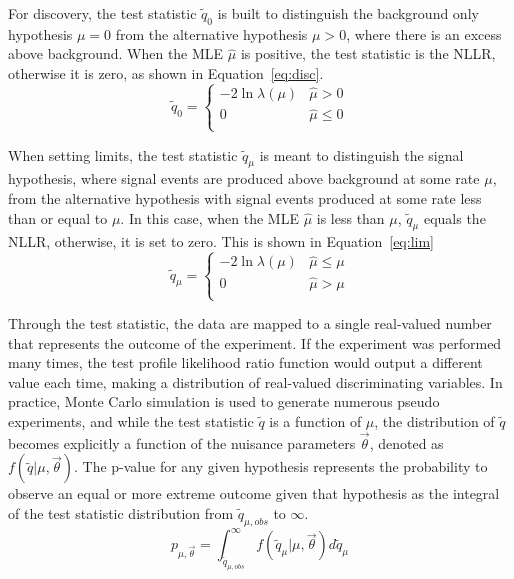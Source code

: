 For discovery, the test statistic $\tilde{q}_0$ is built to distinguish the background only hypothesis $\mu=0$ from the alternative hypothesis $\mu>0$, where there is an excess above background.  When the MLE $\hat{\mu}$ is positive, the test statistic is the NLLR, otherwise it is zero, as shown in Equation~\ref{eq:disc}.
\begin{equation}
\tilde{q}_0=
 \begin{cases} 
      -2\ln\lambda(\mu) & \hat{\mu}> 0 \\
      0 & \hat{\mu}\leq 0 \\
   \end{cases}
   \label{eq:disc}
\end{equation}

When setting limits, the test statistic $\tilde{q}_\mu$ is meant to distinguish the signal hypothesis, where signal events are produced above background at some rate $\mu$, from the alternative hypothesis with signal events produced at some rate less than or equal to $\mu$.  In this case, when the MLE $\hat{\mu}$ is less than $\mu$, $\tilde{q}_\mu$ equals the NLLR, otherwise, it is set to zero.  This is shown in Equation~\ref{eq:lim}
\begin{equation}
\tilde{q}_\mu=
 \begin{cases} 
      -2\ln\lambda(\mu) & \hat{\mu}\leq\mu  \\
      0 & \hat{\mu}>\mu \\
   \end{cases}
   \label{eq:lim}
\end{equation}

Through the test statistic, the data are mapped to a single real-valued number that represents the outcome of the experiment.  If the experiment was performed many times, the test profile likelihood ratio function would output a different value each time, making a distribution of real-valued discriminating variables.  In practice, Monte Carlo simulation is used to generate numerous pseudo experiments, and while the test statistic $\tilde{q}$ is a function of $\mu$, the distribution of $\tilde{q}$ becomes explicitly a function of the nuisance parameters $\vec{\theta}$, denoted as $f(\tilde{q}|\mu,\vec{\theta})$.  The p-value for any given hypothesis represents the probability to observe an equal or more extreme outcome given that hypothesis as the integral of the test statistic distribution from $\tilde{q}_{\mu,obs}$ to $\infty$.  
\begin{equation}
p_{\mu,\vec{\theta}}=\int_{\tilde{q}_{\mu,obs}}^\infty f(\tilde{q}_\mu|\mu,\vec{\theta}) d\tilde{q}_\mu
\label{eq:p0}
\end{equation}

